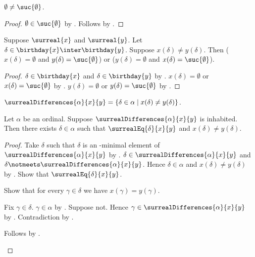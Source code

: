 \begin{proposition}\label{surreal_signs_distinct}
    $\emptyset\neq\suc{\emptyset}$.
\end{proposition}
\begin{proof}
    $\emptyset\in\suc{\emptyset}$ by .
    Follows by .
\end{proof}

\begin{proposition}\label{surreal_unequal_value_cases}
    Suppose $\surreal{x}$ and $\surreal{y}$.
    Let $\delta\in\birthday{x}\inter\birthday{y}$.
    Suppose $x(\delta)\neq y(\delta)$.
    Then
        ($x(\delta)=\emptyset$ and
            $y(\delta)=\suc{\emptyset}$) or
        ($y(\delta)=\emptyset$ and
            $x(\delta)=\suc{\emptyset}$).
\end{proposition}
\begin{proof}
    $\delta\in\birthday{x}$ and $\delta\in\birthday{y}$
        by .
    $x(\delta)=\emptyset$ or
        $x(\delta)=\suc{\emptyset}$
        by .
    $y(\delta)=\emptyset$ or
        $y(\delta)=\suc{\emptyset}$
        by .
\end{proof}

\begin{definition}\label{surreal_differences}
    $\surrealDifferences{\alpha}{x}{y}=
        \{\delta\in\alpha\mid x(\delta)\neq y(\delta)\}$.
\end{definition}

\begin{lemma}\label{surreal_first_difference}
    Let $\alpha$ be an ordinal.
    Suppose $\surrealDifferences{\alpha}{x}{y}$ is inhabited.
    Then there exists $\delta\in\alpha$ such that
        $\surrealEq{\delta}{x}{y}$ and
        $x(\delta)\neq y(\delta)$.
\end{lemma}
\begin{proof}
    Take $\delta$ such that $\delta$ is an \in-minimal element of
        $\surrealDifferences{\alpha}{x}{y}$
        by .
    $\delta\in\surrealDifferences{\alpha}{x}{y}$ and
        $\delta\notmeets\surrealDifferences{\alpha}{x}{y}$.
    Hence $\delta\in\alpha$ and $x(\delta)\neq y(\delta)$
        by .
    Show that $\surrealEq{\delta}{x}{y}$.
    \begin{subproof}
        Show that for every $\gamma\in\delta$ we have
            $x(\gamma)=y(\gamma)$.
        \begin{subproof}
            Fix $\gamma\in\delta$.
            $\gamma\in\alpha$ by .
            Suppose not.
            Hence $\gamma\in\surrealDifferences{\alpha}{x}{y}$
                by .
            Contradiction by .
        \end{subproof}
        Follows by .
    \end{subproof}
\end{proof}

